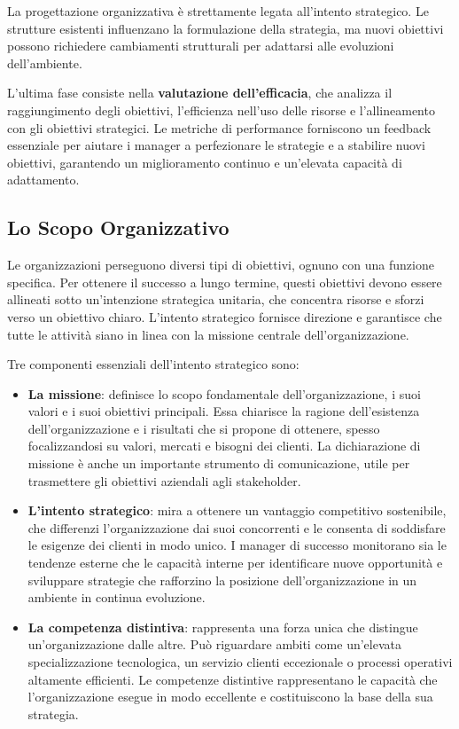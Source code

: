 \documentclass{article}
\begin{document}
La progettazione organizzativa è strettamente legata all’intento strategico. Le strutture esistenti influenzano la formulazione della strategia, ma nuovi obiettivi possono richiedere cambiamenti strutturali per adattarsi alle evoluzioni dell'ambiente.  

L'ultima fase consiste nella \textbf{valutazione dell'efficacia}, che analizza il raggiungimento degli obiettivi, l'efficienza nell'uso delle risorse e l'allineamento con gli obiettivi strategici. Le metriche di performance forniscono un feedback essenziale per aiutare i manager a perfezionare le strategie e a stabilire nuovi obiettivi, garantendo un miglioramento continuo e un'elevata capacità di adattamento.  

\subsection{Lo Scopo Organizzativo}

Le organizzazioni perseguono diversi tipi di obiettivi, ognuno con una funzione specifica. Per ottenere il successo a lungo termine, questi obiettivi devono essere allineati sotto un’intenzione strategica unitaria, che concentra risorse e sforzi verso un obiettivo chiaro. L'intento strategico fornisce direzione e garantisce che tutte le attività siano in linea con la missione centrale dell'organizzazione.  

Tre componenti essenziali dell’intento strategico sono:  

\begin{itemize}
    \item \textbf{La missione}: definisce lo scopo fondamentale dell’organizzazione, i suoi valori e i suoi obiettivi principali. Essa chiarisce la ragione dell’esistenza dell'organizzazione e i risultati che si propone di ottenere, spesso focalizzandosi su valori, mercati e bisogni dei clienti. La dichiarazione di missione è anche un importante strumento di comunicazione, utile per trasmettere gli obiettivi aziendali agli stakeholder.  
    \item \textbf{L'intento strategico}: mira a ottenere un vantaggio competitivo sostenibile, che differenzi l'organizzazione dai suoi concorrenti e le consenta di soddisfare le esigenze dei clienti in modo unico. I manager di successo monitorano sia le tendenze esterne che le capacità interne per identificare nuove opportunità e sviluppare strategie che rafforzino la posizione dell'organizzazione in un ambiente in continua evoluzione.  
    \item \textbf{La competenza distintiva}: rappresenta una forza unica che distingue un'organizzazione dalle altre. Può riguardare ambiti come un'elevata specializzazione tecnologica, un servizio clienti eccezionale o processi operativi altamente efficienti. Le competenze distintive rappresentano le capacità che l’organizzazione esegue in modo eccellente e costituiscono la base della sua strategia.  
\end{itemize}
\end{document}
